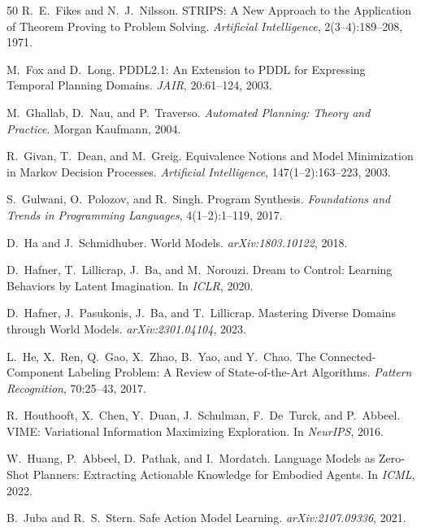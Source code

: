\documentclass{article}
\begin{document}
\begin{thebibliography}{50}
R.~E.~Fikes and N.~J.~Nilsson.
\newblock STRIPS: A New Approach to the Application of Theorem Proving to Problem Solving.
\newblock \emph{Artificial Intelligence}, 2(3--4):189--208, 1971.

M.~Fox and D.~Long.
\newblock PDDL2.1: An Extension to PDDL for Expressing Temporal Planning Domains.
\newblock \emph{JAIR}, 20:61--124, 2003.

M.~Ghallab, D.~Nau, and P.~Traverso.
\newblock \emph{Automated Planning: Theory and Practice}.
\newblock Morgan Kaufmann, 2004.

R.~Givan, T.~Dean, and M.~Greig.
\newblock Equivalence Notions and Model Minimization in Markov Decision Processes.
\newblock \emph{Artificial Intelligence}, 147(1--2):163--223, 2003.

S.~Gulwani, O.~Polozov, and R.~Singh.
\newblock Program Synthesis.
\newblock \emph{Foundations and Trends in Programming Languages}, 4(1--2):1--119, 2017.

D.~Ha and J.~Schmidhuber.
\newblock World Models.
\newblock \emph{arXiv:1803.10122}, 2018.

D.~Hafner, T.~Lillicrap, J.~Ba, and M.~Norouzi.
\newblock Dream to Control: Learning Behaviors by Latent Imagination.
\newblock In \emph{ICLR}, 2020.

D.~Hafner, J.~Pasukonis, J.~Ba, and T.~Lillicrap.
\newblock Mastering Diverse Domains through World Models.
\newblock \emph{arXiv:2301.04104}, 2023.

L.~He, X.~Ren, Q.~Gao, X.~Zhao, B.~Yao, and Y.~Chao.
\newblock The Connected-Component Labeling Problem: A Review of State-of-the-Art Algorithms.
\newblock \emph{Pattern Recognition}, 70:25--43, 2017.

R.~Houthooft, X.~Chen, Y.~Duan, J.~Schulman, F.~De~Turck, and P.~Abbeel.
\newblock VIME: Variational Information Maximizing Exploration.
\newblock In \emph{NeurIPS}, 2016.

W.~Huang, P.~Abbeel, D.~Pathak, and I.~Mordatch.
\newblock Language Models as Zero-Shot Planners: Extracting Actionable Knowledge for Embodied Agents.
\newblock In \emph{ICML}, 2022.

B.~Juba and R.~S.~Stern.
\newblock Safe Action Model Learning.
\newblock \emph{arXiv:2107.09336}, 2021.


\end{thebibliography}
\end{document}
